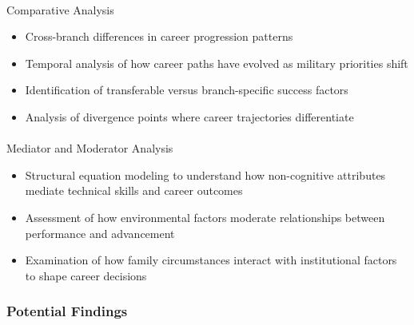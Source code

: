 \documentclass[
  letterpaper,
  DIV=11,
  numbers=noendperiod]{scrartcl}
\makeatletter
\let\oldparagraph\paragraph
\renewcommand{\paragraph}{
    \@ifstar
      \xxxParagraphStar
      \xxxParagraphNoStar
  }
\newcommand{\xxxParagraphStar}[1]{\oldparagraph*{#1}\mbox{}}
\newcommand{\xxxParagraphNoStar}[1]{\oldparagraph{#1}\mbox{}}
\providecommand{\tightlist}{%
  \setlength{\itemsep}{0pt}\setlength{\parskip}{0pt}}
\makeatother
\begin{document}
\paragraph{Comparative Analysis}\label{comparative-analysis}

\begin{itemize}
\tightlist
\item
  Cross-branch differences in career progression patterns
\item
  Temporal analysis of how career paths have evolved as military
  priorities shift
\item
  Identification of transferable versus branch-specific success factors
\item
  Analysis of divergence points where career trajectories differentiate
\end{itemize}

\paragraph{Mediator and Moderator
Analysis}\label{mediator-and-moderator-analysis}

\begin{itemize}
\tightlist
\item
  Structural equation modeling to understand how non-cognitive
  attributes mediate technical skills and career outcomes
\item
  Assessment of how environmental factors moderate relationships between
  performance and advancement
\item
  Examination of how family circumstances interact with institutional
  factors to shape career decisions
\end{itemize}

\subsubsection{Potential Findings}\label{potential-findings}
\end{document}
